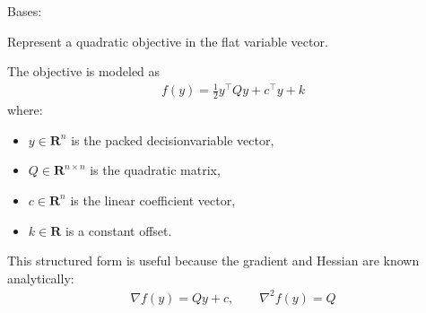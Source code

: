 \documentclass[letterpaper,10pt,english,openany,oneside]{sphinxmanual}
\begin{document}
\begin{fulllineitems}
\label{\detokenize{api/core/jaxmodel/objective:jaxmodel.objective.QuadraticObjective}}
\pysigstartsignatures
{}
\pysigstopsignatures
\sphinxAtStartPar
Bases: 

\sphinxAtStartPar
Represent a quadratic objective in the flat variable vector.

\sphinxAtStartPar
The objective is modeled as
\begin{equation*}
\begin{split}f(y) = \frac{1}{2} y^\top Q y + c^\top y + k\end{split}
\end{equation*}
\sphinxAtStartPar
where:
\begin{itemize}
\item {} 
\sphinxAtStartPar
\(y \in \mathbf{R}^n\) is the packed decision\sphinxhyphen{}variable vector,

\item {} 
\sphinxAtStartPar
\(Q \in \mathbf{R}^{n \times n}\) is the quadratic matrix,

\item {} 
\sphinxAtStartPar
\(c \in \mathbf{R}^n\) is the linear coefficient vector,

\item {} 
\sphinxAtStartPar
\(k \in \mathbf{R}\) is a constant offset.

\end{itemize}

\sphinxAtStartPar
This structured form is useful because the gradient and Hessian are known
analytically:
\begin{equation*}
\begin{split}\nabla f(y) = Q y + c,\qquad \nabla^2 f(y) = Q\end{split}
\end{equation*}


\end{fulllineitems}
\end{document}
